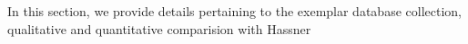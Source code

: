 In this section, we provide details pertaining to the exemplar database collection, 
qualitative and quantitative comparision with Hassner ~\etal
